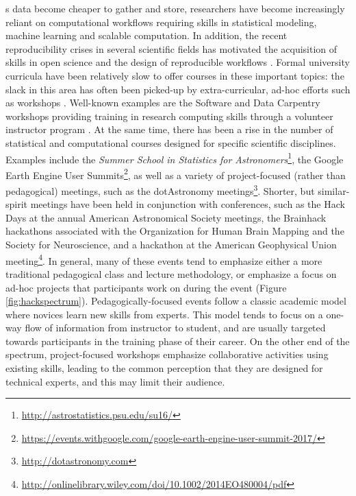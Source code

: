 \label{sec:introduction}
s data become cheaper to gather and store, researchers have become increasingly reliant on computational workflows requiring skills in statistical modeling, machine learning and scalable computation. In addition, the recent reproducibility crises in several scientific fields has motivated the acquisition of skills in open science and the design of reproducible workflows \cite[e.g.][]{pashler2012,baker2016}.
Formal university curricula have been relatively slow to offer courses in these important topics: the slack in this area has often been picked-up by extra-curricular, ad-hoc efforts such as workshops \cite{demasi2017}.
Well-known examples are the Software and Data Carpentry workshops providing training in research computing skills through a volunteer instructor program \cite{b:wilson-swc-lessons-2016,teal2015data}.
At the same time, there has been a rise in the number of statistical and computational courses designed for specific scientific disciplines.
Examples include the \textit{Summer School in Statistics for Astronomers}\footnote{\url{http://astrostatistics.psu.edu/su16/}}, the Google Earth Engine User Summits\footnote{\url{https://events.withgoogle.com/google-earth-engine-user-summit-2017/}}, as well as a variety of project-focused (rather than pedagogical) meetings, such as the dotAstronomy meetings\footnote{\url{http://dotastronomy.com}}.
Shorter, but similar-spirit meetings have been held in conjunction with conferences, such as the Hack Days at the annual American Astronomical Society meetings, the Brainhack hackathons associated with the Organization for Human Brain Mapping and the Society for Neuroscience\cite{Cameron_Craddock2016-wc}, and a hackathon at the American Geophysical Union meeting\footnote{\url{http://onlinelibrary.wiley.com/doi/10.1002/2014EO480004/pdf}}. 
In general, many of these events tend to emphasize either a more traditional pedagogical class and lecture methodology, or emphasize a focus on ad-hoc projects that participants work on during the event (Figure \ref{fig:hackspectrum}).
Pedagogically-focused events follow a classic academic model where novices learn new skills from experts. This model tends to focus on a one-way flow of information from instructor to student, and are usually targeted towards participants in the training phase of their career. On the other end of the spectrum, project-focused workshops emphasize collaborative activities using existing skills, leading to the common perception that they are designed for technical experts, and this may limit their audience. 
